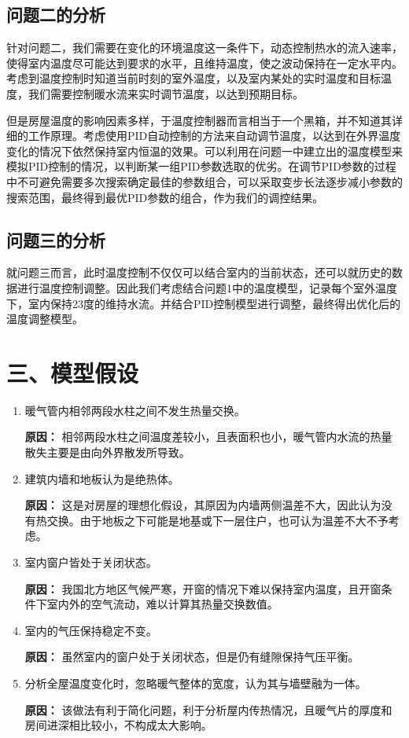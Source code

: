 \documentclass{my_paper}
\begin{document}
\subsection{问题二的分析}

针对问题二，我们需要在变化的环境温度这一条件下，动态控制热水的流入速率，使得室内温度尽可能达到要求的水平，且维持温度，使之波动保持在一定水平内。考虑到温度控制时知道当前时刻的室外温度，以及室内某处的实时温度和目标温度，我们需要控制暖水流来实时调节温度，以达到预期目标。

但是房屋温度的影响因素多样，于温度控制器而言相当于一个黑箱，并不知道其详细的工作原理。考虑使用PID自动控制的方法来自动调节温度，以达到在外界温度变化的情况下依然保持室内恒温的效果。可以利用在问题一中建立出的温度模型来模拟PID控制的情况，以判断某一组PID参数选取的优劣。在调节PID参数的过程中不可避免需要多次搜索确定最佳的参数组合，可以采取变步长法逐步减小参数的搜索范围，最终得到最优PID参数的组合，作为我们的调控结果。

\subsection{问题三的分析}

就问题三而言，此时温度控制不仅仅可以结合室内的当前状态，还可以就历史的数据进行温度控制调整。因此我们考虑结合问题1中的温度模型，记录每个室外温度下，室内保持23度的维持水流。并结合PID控制模型进行调整，最终得出优化后的温度调整模型。
\section{三、模型假设}
\begin{enumerate}
    \item 暖气管内相邻两段水柱之间不发生热量交换。
    
    \textbf{原因：}
    相邻两段水柱之间温度差较小，且表面积也小，暖气管内水流的热量散失主要是由向外界散发所导致。

    \item 建筑内墙和地板认为是绝热体。
    
    \textbf{原因：}
    这是对房屋的理想化假设，其原因为内墙两侧温差不大，因此认为没有热交换。由于地板之下可能是地基或下一层住户，也可认为温差不大不予考虑。
    
    \item 室内窗户皆处于关闭状态。
    
    \textbf{原因：}
    我国北方地区气候严寒，开窗的情况下难以保持室内温度，且开窗条件下室内外的空气流动，难以计算其热量交换数值。

    \item 室内的气压保持稳定不变。
    
    \textbf{原因：}
    虽然室内的窗户处于关闭状态，但是仍有缝隙保持气压平衡。

    \item 分析全屋温度变化时，忽略暖气整体的宽度，认为其与墙壁融为一体。
    
    \textbf{原因：}
    该做法有利于简化问题，利于分析屋内传热情况，且暖气片的厚度和房间进深相比较小，不构成太大影响。

\end{enumerate}
\end{document}
